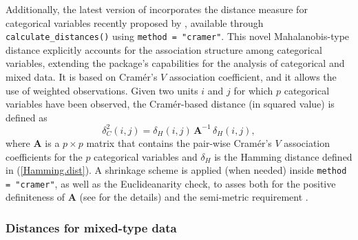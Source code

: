 Additionally, the latest version of  incorporates the distance measure for categorical variables recently proposed by \cite{Grane2026}, available through \texttt{calculate\_distances()} using \texttt{method = "cramer"}. This novel Mahalanobis-type distance explicitly accounts for the association structure among categorical variables, extending the package's capabilities for the analysis of categorical and mixed data. It is based on Cramér's $V$ association coefficient, and it allows the use of weighted observations. Given two units $i$ and $j$ for which $p$ categorical variables have been observed, the Cramér-based distance (in squared value) is defined as
\begin{equation}
\label{Cramer.dist}
\delta_{C}^2(i,j)=\delta_{H}(i,j)\,\mathbf{A}^{-1}\,\delta_{H}(i,j),  
\end{equation}
where $\mathbf{A}$ is a $p \times p$ matrix that contains the pair-wise Cramér's $V$ association coefficients for the $p$ categorical variables and $\delta_{H}$ is the Hamming distance defined in (\ref{Hamming.dist}). A shrinkage scheme is applied (when needed) inside \texttt{method = "cramer"}, as well as the Euclideanarity check, to asses both for the positive definiteness of $\mathbf{A}$  (see \citealp{Grane2026} for the details) and the semi-metric requirement \citep{gower1986metric}.

\subsubsection{Distances for mixed-type data}
\label{sec:mixed_type_distances}

